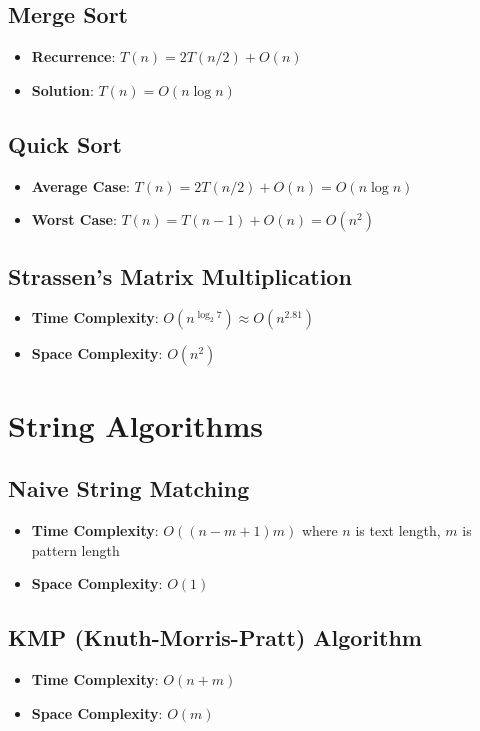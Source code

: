 \documentclass[11pt]{article}
\theoremstyle{definition}
\begin{document}
\subsection{Merge Sort}
\begin{itemize}
    \item \textbf{Recurrence}: $T(n) = 2T(n/2) + O(n)$
    \item \textbf{Solution}: $T(n) = O(n \log n)$
\end{itemize}

\subsection{Quick Sort}
\begin{itemize}
    \item \textbf{Average Case}: $T(n) = 2T(n/2) + O(n) = O(n \log n)$
    \item \textbf{Worst Case}: $T(n) = T(n-1) + O(n) = O(n^2)$
\end{itemize}

\subsection{Strassen's Matrix Multiplication}
\begin{itemize}
    \item \textbf{Time Complexity}: $O(n^{\log_2 7}) \approx O(n^{2.81})$
    \item \textbf{Space Complexity}: $O(n^2)$
\end{itemize}

\section{String Algorithms}

\subsection{Naive String Matching}
\begin{itemize}
    \item \textbf{Time Complexity}: $O((n-m+1)m)$ where $n$ is text length, $m$ is pattern length
    \item \textbf{Space Complexity}: $O(1)$
\end{itemize}

\subsection{KMP (Knuth-Morris-Pratt) Algorithm}
\begin{itemize}
    \item \textbf{Time Complexity}: $O(n + m)$
    \item \textbf{Space Complexity}: $O(m)$
\end{itemize}
\end{document}
